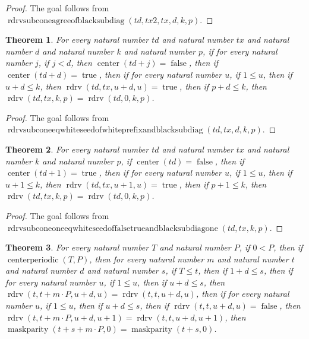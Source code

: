 \documentclass[11pt]{article}
\newtheorem{theorem}{Theorem}[section]
\theoremstyle{definition}
\begin{document}
\begin{proof}
The goal follows from \(\operatorname{rdrvsubconeagreeofblacksubdiag}(td, tx2, tx, d, k, p)\).
\end{proof}
\begin{theorem}
\label{ll:paper:rdrv-subcone-eq-white-seed-of-white-prefix-and-black-subdiag}
For every natural number \(td\) and natural number \(tx\) and natural number \(d\) and natural number \(k\) and natural number \(p\), if for every natural number \(j\), if \(j < d\), then \(\operatorname{center}(td + j) = \operatorname{false}\), then if \(\operatorname{center}(td + d) = \operatorname{true}\), then if for every natural number \(u\), if \(1 \le u\), then if \(u + d \le k\), then \(\operatorname{rdrv}(td, tx, u + d, u) = \operatorname{true}\), then if \(p + d \le k\), then \(\operatorname{rdrv}(td, tx, k, p) = \operatorname{rdrv}(td, 0, k, p)\).
\end{theorem}
\begin{proof}
The goal follows from \(\operatorname{rdrvsubconeeqwhiteseedofwhiteprefixandblacksubdiag}(td, tx, d, k, p)\).
\end{proof}
\begin{theorem}
\label{ll:paper:rdrv-subcone-one-eq-white-seed-of-false-true-and-black-subdiag-one}
For every natural number \(td\) and natural number \(tx\) and natural number \(k\) and natural number \(p\), if \(\operatorname{center}(td) = \operatorname{false}\), then if \(\operatorname{center}(td + 1) = \operatorname{true}\), then if for every natural number \(u\), if \(1 \le u\), then if \(u + 1 \le k\), then \(\operatorname{rdrv}(td, tx, u + 1, u) = \operatorname{true}\), then if \(p + 1 \le k\), then \(\operatorname{rdrv}(td, tx, k, p) = \operatorname{rdrv}(td, 0, k, p)\).
\end{theorem}
\begin{proof}
The goal follows from \(\operatorname{rdrvsubconeoneeqwhiteseedoffalsetrueandblacksubdiagone}(td, tx, k, p)\).
\end{proof}
\begin{theorem}
\label{ll:paper:periodic-maskparity-zero-agree-of-subdiag-gate}
For every natural number \(T\) and natural number \(P\), if \(0 < P\), then if \(\operatorname{centerperiodic}(T, P)\), then for every natural number \(m\) and natural number \(t\) and natural number \(d\) and natural number \(s\), if \(T \le t\), then if \(1 + d \le s\), then if for every natural number \(u\), if \(1 \le u\), then if \(u + d \le s\), then \(\operatorname{rdrv}(t, t + m \cdot P, u + d, u) = \operatorname{rdrv}(t, t, u + d, u)\), then if for every natural number \(u\), if \(1 \le u\), then if \(u + d \le s\), then if \(\operatorname{rdrv}(t, t, u + d, u) = \operatorname{false}\), then \(\operatorname{rdrv}(t, t + m \cdot P, u + d, u + 1) = \operatorname{rdrv}(t, t, u + d, u + 1)\), then \(\operatorname{maskparity}(t + s + m \cdot P, 0) = \operatorname{maskparity}(t + s, 0)\).
\end{theorem}
\end{document}
